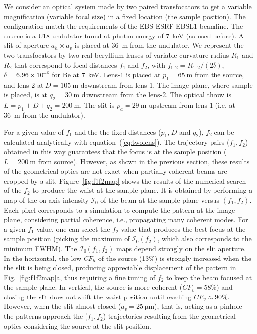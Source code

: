 \documentclass{osa-article}
\begin{document}
We consider an optical system made by two paired transfocators to get a variable magnification (variable focal size) in a fixed location (the sample position). The configuration match the requirements of the EBS-ESRF EBSL1 beamline. 
The source is a U18 undulator tuned at photon energy of \SI{7}{keV} (as used before). A slit of aperture $a_h \times a_v$ is placed at \SI{36}{\meter} from the undulator.  
We represent the two transfocators by two real beryllium lenses of variable curvature radius $R_1$ and $R_2$ that correspond to focal distances $f_1$ and $f_2$, with $f_{1,2}=R_{1,2}/(2 \delta)$, $\delta=6.96\times10^{-6}$ for Be at \SI{7}{keV}. Lens-1 is placed at $p_1=\SI{65}{\meter}$ from the source, and lens-2 at $D=\SI{105}{\meter}$ downstream from lens-1. The image plane, where sample is placed, is at $q_2=\SI{30}{\meter}$ downstream from the lens-2. The optical throw is $L=p_1+D+q_2=\SI{200}{\meter}$. The slit is $p_a=\SI{29}{\meter}$ upstream from lens-1 (i.e. at \SI{36}{\meter} from the undulator). 

For a given value of $f_1$ and the the fixed distances ($p_1$, $D$ and $q_2$), $f_2$ can be calculated analytically with equation~(\ref{eq:twolens}). The trajectory pairs ($f_1,f_2$) obtained in this way guarantees that the focus is at the sample position ($L=\SI{200}{\meter}$ from source). However, as shown in the previous section, these results of the geometrical optics are not exact when partially coherent beams are cropped by a slit. 
Figure~\ref{fig:f1f2map} shows the results of the numerical search of the $f_2$ to produce the waist at the sample plane. It is obtained by performing a map of the on-axis intensity $\mathcal{I}_0$ of the beam at the sample plane versus $(f_1,f_2)$. Each pixel corresponds to a simulation to compute the pattern at the image plane, considering partial coherence, i.e., propagating many coherent modes. For a given $f_1$ value, one can select the $f_2$ value that produces the best focus at the sample position (picking the maximum of $\mathcal{I}_0(f_2)$, which also corresponds to the minimum FWHM). 
The $\mathcal{I}_0(f_1,f_2)$ maps depend strongly on the slit aperture. In the horizontal, the low $CF_h$ of the source (13\%) is strongly increased when the the slit is being closed, producing appreciable displacement of the pattern in Fig.~\ref{fig:f1f2map}a, thus requiring a fine tuning of $f_2$ to keep the beam focused at the sample plane. In vertical, the source is more coherent ($CF_v=58\%$) and closing the slit does not 
shift the waist position until reaching $CF_v\approx90\%$. However, when the slit almost closed ($a_v=\SI{25}{\micro\meter}$), that is, acting as a pinhole the patterns approach the ($f_1,f_2$) trajectories resulting from the geometrical optics considering the source at the slit position.
\end{document}

